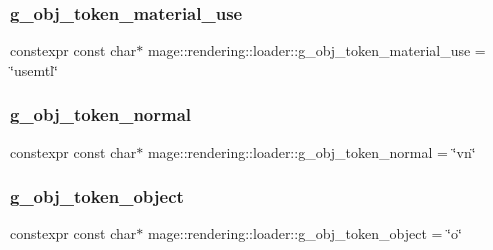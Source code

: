 \hypertarget{namespacemage_1_1rendering_1_1loader_ac064d06ba84b45092115a1b8d7e0d3b3}{}\label{namespacemage_1_1rendering_1_1loader_ac064d06ba84b45092115a1b8d7e0d3b3} 
\subsubsection{\texorpdfstring{g\+\_\+obj\+\_\+token\+\_\+material\+\_\+use}{g\_obj\_token\_material\_use}}
{\footnotesize\ttfamily constexpr const char$\ast$ mage\+::rendering\+::loader\+::g\+\_\+obj\+\_\+token\+\_\+material\+\_\+use = \char`\"{}usemtl\char`\"{}}

\hypertarget{namespacemage_1_1rendering_1_1loader_a7fc2fa78dc01deb91e9b405618d1391e}{}\label{namespacemage_1_1rendering_1_1loader_a7fc2fa78dc01deb91e9b405618d1391e} 
\subsubsection{\texorpdfstring{g\+\_\+obj\+\_\+token\+\_\+normal}{g\_obj\_token\_normal}}
{\footnotesize\ttfamily constexpr const char$\ast$ mage\+::rendering\+::loader\+::g\+\_\+obj\+\_\+token\+\_\+normal = \char`\"{}vn\char`\"{}}

\hypertarget{namespacemage_1_1rendering_1_1loader_a929d4caaeb9cb1dc8b7393d5b9fa1eac}{}\label{namespacemage_1_1rendering_1_1loader_a929d4caaeb9cb1dc8b7393d5b9fa1eac} 
\subsubsection{\texorpdfstring{g\+\_\+obj\+\_\+token\+\_\+object}{g\_obj\_token\_object}}
{\footnotesize\ttfamily constexpr const char$\ast$ mage\+::rendering\+::loader\+::g\+\_\+obj\+\_\+token\+\_\+object = \char`\"{}o\char`\"{}}

